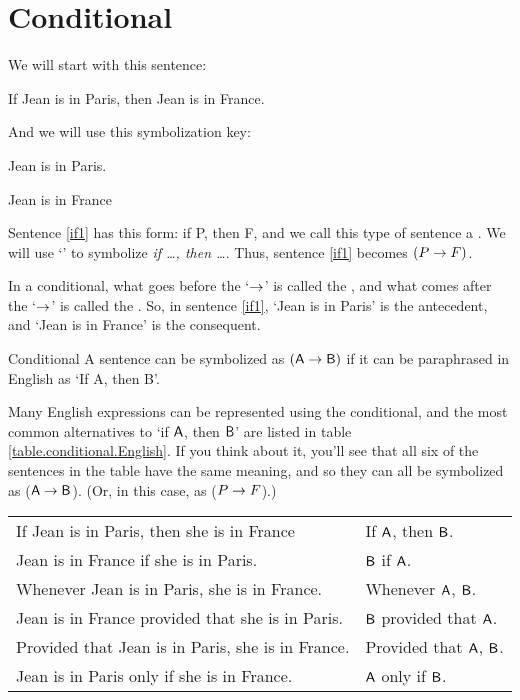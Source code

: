 \section{Conditional}

We will start with this sentence:
	\begin{earg}
		\item[\ex{if1}] If Jean is in Paris, then Jean is in France.
	\end{earg}
And we will use this symbolization key:
	\begin{ekey}
		\item[P] Jean is in Paris.
		\item[F] Jean is in France
	\end{ekey}
Sentence \ref{if1} has this form: if P, then F, and we call this type of sentence a . We will use `\eif' to symbolize \textit{if \ldots, then \ldots}. Thus, sentence \ref{if1} becomes $(P\rightarrow F)$. 

In a conditional, what goes before the `$\rightarrow$'  is called the , and what comes after the `$\rightarrow$' is called the . So, in sentence \ref{if1}, `Jean is in Paris' is the antecedent, and `Jean is in France' is the consequent.

\begin{factboxy}{Conditional}
A sentence can be symbolized as $(\mathsf{A} \rightarrow \mathsf{B})$ if it can be paraphrased in English as `If A, then B'.
\end{factboxy}

Many English expressions can be represented using the conditional, and the most common alternatives to `if $\mathsf{A}$, then $\mathsf{B}$' are listed in table \ref{table.conditional.English}. If you think about it, you'll see that all six of the sentences in the table have the same meaning, and so they can all be symbolized as ($\mathsf{A} \rightarrow \mathsf{B}$). (Or, in this case, as ($P \rightarrow F$).)


\begin{table*}[b]\centering\sffamily\footnotesize
{}
\begin{tabular}{@{}l l@{}}\toprule
If Jean is in Paris, then she is in France & If $\mathsf{A}$, then $\mathsf{B}$.\\
Jean is in France if she is in Paris. 	&	$\mathsf{B}$ if $\mathsf{A}$.\\
Whenever Jean is in Paris, she is in France.  	&	Whenever $\mathsf{A}$, $\mathsf{B}$.\\
Jean is in France provided that she is in Paris. 	&	$\mathsf{B}$ provided that $\mathsf{A}$.\\
Provided that Jean is in Paris, she is in France. 	&	Provided that $\mathsf{A}$, $\mathsf{B}$.\\
Jean is in Paris only if she is in France. 	&	$\mathsf{A}$ only if $\mathsf{B}$.\\
\bottomrule
\end{tabular}
\caption{The most common way of expressing a conditional in English is as `If Jean is in Paris, then she is in France.' This table lists some alternative but equivalent ways of expressing the same sentence.}\label{table.conditional.English}
\end{table*}



